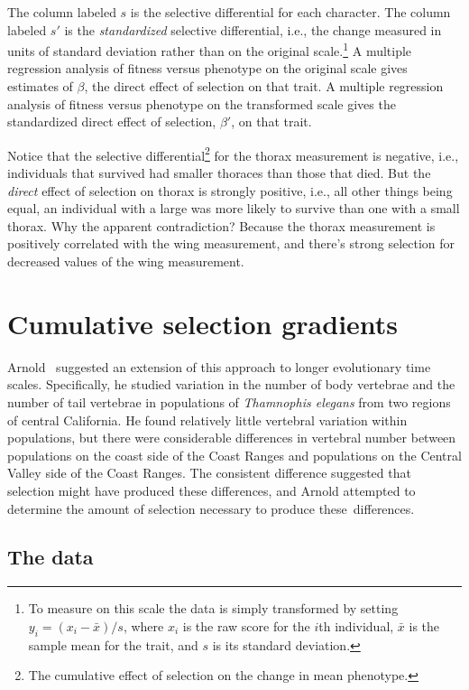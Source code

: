 \documentclass[12pt]{article}
\begin{document}
The column labeled $s$ is the selective differential for each
character. The column labeled $s'$ is the {\it standardized\/}
selective differential, i.e., the change measured in units of standard
deviation rather than on the original scale.\footnote{To measure on
  this scale the data is simply transformed by setting $y_i = (x_i -
  \bar x)/s$, where $x_i$ is the raw score for the $i$th individual,
  $\bar x$ is the sample mean for the trait, and $s$ is its standard
  deviation.} A multiple regression analysis of fitness versus
phenotype on the original scale gives estimates of $\beta$, the direct
effect of selection on that trait. A multiple regression analysis of
fitness versus phenotype on the transformed scale gives the
standardized direct effect of selection, $\beta'$, on that trait.

Notice that the selective differential\footnote{The cumulative effect
  of selection on the change in mean phenotype.} for the thorax
measurement is negative, i.e., individuals that survived had smaller
thoraces than those that died. But the {\it direct\/} effect of
selection on thorax is strongly positive, i.e., all other things being
equal, an individual with a large was more likely to survive than one
with a small thorax. Why the apparent contradiction? Because the
thorax measurement is positively correlated with the wing measurement,
and there's strong selection for decreased values of the wing
measurement.

\section*{Cumulative selection gradients}

Arnold~\cite{Arnold-1988} suggested an extension of this approach to
longer evolutionary time scales. Specifically, he studied variation in
the number of body vertebrae and the number of tail vertebrae in
populations of {\it Thamnophis elegans} from two regions of central
California. He found relatively little vertebral variation within
populations, but there were considerable differences in vertebral
number between populations on the coast side of the Coast Ranges and
populations on the Central Valley side of the Coast Ranges. The
consistent difference suggested that selection might have produced
these differences, and Arnold attempted to determine the amount of
selection necessary to produce these~differences.

\subsection*{The data}
\end{document}
